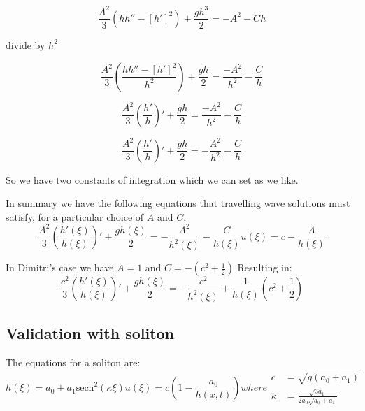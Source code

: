 \documentclass[subeqn]{article}
\begin{document}
\begin{equation*}
\frac{A^2}{3} \left({h h'' - \left[h'\right]^2} \right) + \frac{gh^3}{2}   =  -{A^2} - Ch
\end{equation*}

divide by $h^2$

\begin{equation*}
\frac{A^2}{3} \left(\frac{h h'' - \left[h'\right]^2}{h^2} \right) + \frac{gh}{2}   =  \frac{-{A^2}}{h^2} - \frac{C}{h}
\end{equation*}

\begin{equation*}
\frac{A^2}{3} \left(\frac{h'}{h} \right)' + \frac{gh}{2}   =  \frac{-{A^2}}{h^2} - \frac{C}{h}
\end{equation*}

\begin{equation*}
\frac{A^2}{3} \left(\frac{h'}{h} \right)' + \frac{gh}{2}   =  -\frac{{A^2}}{h^2} - \frac{C}{h}
\end{equation*}

So we have two constants of integration which we can set as we like. 

In summary we have the following equations that travelling wave solutions must satisfy, for a particular choice of $A$ and $C$.
\begin{subequations}
\label{eqnSerreSat}
\begin{equation}
\label{eqnSerreSath}
\frac{A^2}{3} \left(\frac{h'(\xi)}{h(\xi)} \right)' + \frac{gh(\xi)}{2}   =  -\frac{{A^2}}{h^2(\xi)} - \frac{C}{h(\xi)}
\end{equation}
\begin{equation}
\label{eqnSerreSatu}
u(\xi) = c - \frac{A}{h(\xi)}
\end{equation}
\end{subequations}

In Dimitri's case we have $A = 1$ and $C = -\left(c^2 + \frac{1}{2}\right) $
Resulting in:
\[\frac{c^2}{3} \left(\frac{h'(\xi)}{h(\xi)} \right)' + \frac{gh(\xi)}{2}   =  -\frac{{c^2}}{h^2(\xi)} + \frac{1}{h(\xi)}\left(c^2 + \frac{1}{2} \right)\]

\subsection{Validation with soliton}

The equations for a soliton are:
\begin{subequations}
	\label{eqnsol}
	\begin{equation}
	\label{eqnSolitonh}
	h(\xi) = a_0 + a_1\text{sech}^2\left( \kappa \xi\right)
	\end{equation}
	\begin{equation}
	\label{eqnSolitonu}
	u(\xi) = c\left(1 - \frac{a_0}{h(x,t)}\right)
	\end{equation}
	where
	\begin{align}
	\label{paramsc}
	c &= \sqrt{g\left(a_0 + a_1\right)}\\
	\label{paramsk}
	\kappa &= \frac{\sqrt{3a_1}}{2 a_0 \sqrt{a_0 + a_1}}
	\end{align}
\end{subequations}
\end{document}
